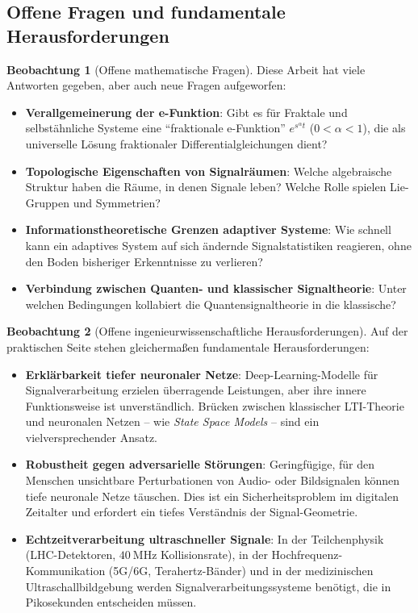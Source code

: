 ﻿\documentclass[a4paper,12pt]{report}
\theoremstyle{definition}
\newtheorem{beobachtung}{Beobachtung}
\begin{document}
	\subsection{Offene Fragen und fundamentale Herausforderungen}
	
	\begin{beobachtung}[Offene mathematische Fragen]
		Diese Arbeit hat viele Antworten gegeben, aber auch neue Fragen aufgeworfen:
		\begin{itemize}
			\item[-] \textbf{Verallgemeinerung der e-Funktion}: Gibt es für Fraktale und selbstähnliche Systeme eine ``fraktionale e-Funktion'' $e^{s^\alpha t}$ ($0 < \alpha < 1$), die als universelle Lösung fraktionaler Differentialgleichungen dient?
			\item[-] \textbf{Topologische Eigenschaften von Signalräumen}: Welche algebraische Struktur haben die Räume, in denen Signale leben? Welche Rolle spielen Lie-Gruppen und Symmetrien?
			\item[-] \textbf{Informationstheoretische Grenzen adaptiver Systeme}: Wie schnell kann ein adaptives System auf sich ändernde Signalstatistiken reagieren, ohne den Boden bisheriger Erkenntnisse zu verlieren?
			\item[-] \textbf{Verbindung zwischen Quanten- und klassischer Signaltheorie}: Unter welchen Bedingungen kollabiert die Quantensignaltheorie in die klassische?
		\end{itemize}
	\end{beobachtung}
	
	\begin{beobachtung}[Offene ingenieurwissenschaftliche Herausforderungen]
		Auf der praktischen Seite stehen gleichermaßen fundamentale Herausforderungen:
		\begin{itemize}
			\item[-] \textbf{Erklärbarkeit tiefer neuronaler Netze}: Deep-Learning-Modelle für Signalverarbeitung erzielen überragende Leistungen, aber ihre innere Funktionsweise ist unverständlich. Brücken zwischen klassischer LTI-Theorie und neuronalen Netzen -- wie \emph{State Space Models} -- sind ein vielversprechender Ansatz.
			\item[-] \textbf{Robustheit gegen adversarielle Störungen}: Geringfügige, für den Menschen unsichtbare Perturbationen von Audio- oder Bildsignalen können tiefe neuronale Netze täuschen. Dies ist ein Sicherheitsproblem im digitalen Zeitalter und erfordert ein tiefes Verständnis der Signal-Geometrie.
			\item[-] \textbf{Echtzeitverarbeitung ultraschneller Signale}: In der Teilchenphysik (LHC-Detektoren, $40~\text{MHz}$ Kollisionsrate), in der Hochfrequenz-Kommunikation (5G/6G, Terahertz-Bänder) und in der medizinischen Ultraschallbildgebung werden Signalverarbeitungssysteme benötigt, die in Pikosekunden entscheiden müssen.
		\end{itemize}
	\end{beobachtung}
	
\end{document}
